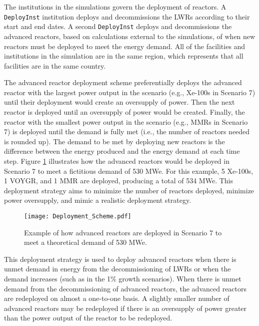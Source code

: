 The institutions in the simulations 
govern the deployment of reactors. A \Cycamore \texttt{DeployInst} 
institution \cite{huff_fundamental_2016} deploys and decommissions the 
\glspl{LWR} according to their start and end dates. A second \Cycamore 
\texttt{DeployInst} deploys and decommissions the advanced reactors, 
based on calculations external to the \Cyclus simulations, of when 
new reactors must be deployed to meet the energy 
demand. All of the facilities and institutions in the simulation are in 
the same region, which represents that all facilities are in the same 
country. 

The advanced reactor deployment scheme preferentially deploys the advanced 
reactor with the largest power output in the scenario (e.g., Xe-100s in 
Scenario 7) until their deployment would create an oversupply of power. 
Then the next reactor is deployed until an oversupply of power would be 
created. Finally, the reactor 
with the smallest power output in the scenario (e.g., \glspl{MMR} in 
Scenario 7) is deployed until the demand is fully met (i.e., the number of 
reactors needed is rounded up). The demand 
to be met by deploying new reactors is the difference between the energy 
produced and the energy demand at each time step. 
Figure \ref{fig:AR_deployment} illustrates how the advanced reactors 
would be deployed in Scenario 7 to meet a fictitious demand of 530 MWe. For this 
example, 5 Xe-100s, 1 VOYGR, and 1 \gls{MMR} are deployed, producing a 
total of 534 MWe. This deployment 
strategy aims to minimize the number of reactors deployed,  
minimize power oversupply, and mimic a realistic deployment strategy.

\begin{figure}[ht]
    \centering
    \texttt{[image: Deployment\_Scheme.pdf]}
    \caption{Example of how advanced reactors are deployed in Scenario 7 
    to meet a theoretical demand of 530 MWe.}
    \label{fig:AR_deployment}
\end{figure}

This deployment strategy is used to deploy advanced reactors when there is
unmet demand in energy from the decommissioning of \glspl{LWR} or 
when the demand increases (such as in the 1\% growth scenarios). When 
there is unmet demand from the decommissioning of advanced reactors, the 
advanced reactors are redeployed on almost a one-to-one basis. A slightly
smaller number of advanced reactors may be redeployed if there is an 
oversupply of power greater than the power output of the reactor to be 
redeployed. 

